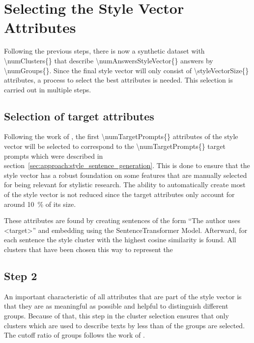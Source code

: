 \section{Selecting the Style Vector Attributes}
\label{sec:approach:selection}

Following the previous steps, there is now a synthetic dataset with \num{\numClusters{}} that describe \num{\numAnswersStyleVector{}} answers by \num{\numGroups{}}. Since the final style vector will only consist of \num{\styleVectorSize{}} attributes, a process to select the best attributes is needed. This selection is carried out in multiple steps.

\subsection{Selection of target attributes}
\label{sec:approach:selection:target_attributes}
Following the work of \citet{patelLearningInterpretableStyle2023}, the first \num{\numTargetPrompts{}} attributes of the style vector will be selected to correspond to the \num{\numTargetPrompts{}} target prompts which were described in section~\ref{sec:approach:style_sentence_generation}.
This is done to ensure that the style vector has a robust foundation on some features that are manually selected for being relevant for stylistic research. The ability to automatically create most of the style vector is not reduced since the target attributes only account for around \SI{10}{\percent} of its size.

These attributes are found by creating sentences of the form \enquote{The author uses <target>} and embedding using the SentenceTransformer Model. %
Afterward, for each sentence the style cluster with the highest cosine similarity is found.
All clusters that have been chosen this way to represent the

\subsection{Step 2}
An important characteristic of all attributes that are part of the style vector is that they are as meaningful as possible and helpful to distinguish different groups. Because of that, this step in the cluster selection ensures that only clusters which are used to describe texts by less than \clusterMaxGroupRatio{} of the groups are selected. The cutoff ratio of groups follows the work of \citet{patelLearningInterpretableStyle2023}.

